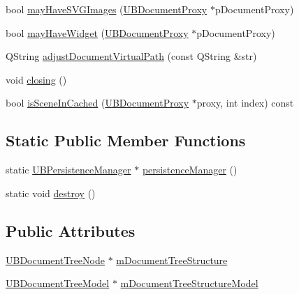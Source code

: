 \begin{DoxyCompactItemize}
\item 
bool \hyperlink{class_u_b_persistence_manager_ae2a836bf573c4b9d71c0dcdfed20c602}{may\-Have\-S\-V\-G\-Images} (\hyperlink{class_u_b_document_proxy}{U\-B\-Document\-Proxy} $\ast$p\-Document\-Proxy)
\item 
bool \hyperlink{class_u_b_persistence_manager_aa237811b3805b3e3f7514a8624e439db}{may\-Have\-Widget} (\hyperlink{class_u_b_document_proxy}{U\-B\-Document\-Proxy} $\ast$p\-Document\-Proxy)
\item 
Q\-String \hyperlink{class_u_b_persistence_manager_a17473610061f1247e204e1373edba773}{adjust\-Document\-Virtual\-Path} (const Q\-String \&str)
\item 
void \hyperlink{class_u_b_persistence_manager_af9c60a1285be9efd821c4603540defa2}{closing} ()
\item 
bool \hyperlink{class_u_b_persistence_manager_a8fe0be7694e8322dc7234e37bccbc78f}{is\-Scene\-In\-Cached} (\hyperlink{class_u_b_document_proxy}{U\-B\-Document\-Proxy} $\ast$proxy, int index) const 
\end{DoxyCompactItemize}
\subsection*{Static Public Member Functions}
\begin{DoxyCompactItemize}
\item 
static \hyperlink{class_u_b_persistence_manager}{U\-B\-Persistence\-Manager} $\ast$ \hyperlink{class_u_b_persistence_manager_ad8b7a880564523143d73c6b86d887769}{persistence\-Manager} ()
\item 
static void \hyperlink{class_u_b_persistence_manager_a3a2587297272388d7c63abd7cf237406}{destroy} ()
\end{DoxyCompactItemize}
\subsection*{Public Attributes}
\begin{DoxyCompactItemize}
\item 
\hyperlink{class_u_b_document_tree_node}{U\-B\-Document\-Tree\-Node} $\ast$ \hyperlink{class_u_b_persistence_manager_ac901694c75aea223436f520692703f81}{m\-Document\-Tree\-Structure}
\item 
\hyperlink{class_u_b_document_tree_model}{U\-B\-Document\-Tree\-Model} $\ast$ \hyperlink{class_u_b_persistence_manager_a2e25c262cc712d327aeb68f40ba8085f}{m\-Document\-Tree\-Structure\-Model}
\end{DoxyCompactItemize}
